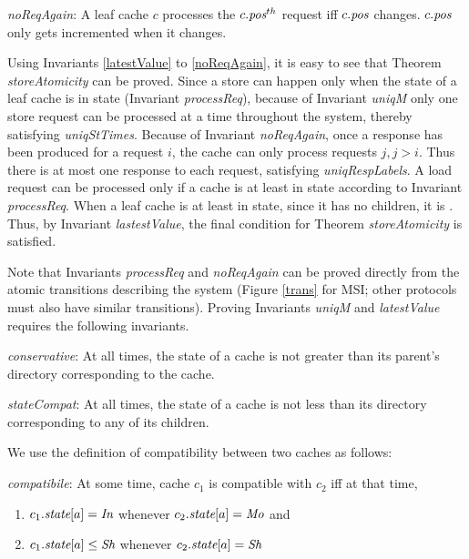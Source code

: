 \begin{inv}
\textit{noReqAgain}: A leaf cache $c$ processes the $c.\textit{pos}^{th}$ request iff
$c.\textit{pos}$ changes. $c.\textit{pos}$ only gets incremented when it changes.
\label{noReqAgain}
\end{inv}

Using Invariants \ref{latestValue} to \ref{noReqAgain}, it is easy to see that
Theorem \textit{storeAtomicity} can be proved. Since a store can happen only
when the state of a leaf cache is in \Mo{} state (Invariant
\textit{processReq}), because of Invariant \textit{uniqM} only one store
request can be processed at a time throughout the system, thereby satisfying
\textit{uniqStTimes}. Because of Invariant \textit{noReqAgain}, once a response
has been produced for a request $i$, the cache can only process requests $j, j
> i$. Thus there is at most one response to each request, satisfying
\textit{uniqRespLabels}. A load request can be processed only if a cache is at
least in \Sh{} state according to Invariant \textit{processReq}.  When a leaf
cache is at least in \Sh{} state, since it has no children, it is \clean{}.
Thus, by Invariant \textit{lastestValue}, the final condition for Theorem
\textit{storeAtomicity} is satisfied.

Note that Invariants \textit{processReq} and \textit{noReqAgain} can be proved
directly from the atomic transitions describing the system (Figure \ref{trans}
for MSI; other protocols must also have similar transitions). Proving Invariants
\textit{uniqM} and \textit{latestValue} requires the following invariants.

\begin{inv}
\textit{conservative}: At all times, the state of a cache is not greater than
its parent's directory corresponding to the cache.
\label{conservative}
\end{inv}

\begin{inv}
\textit{stateCompat}: At all times, the state of a cache is not less than its
directory corresponding to any of its children.
\label{stateCompat}
\end{inv}

We use the definition of compatibility between two caches as follows:
\begin{defn}
\textit{compatibile}: At some time, cache $c_1$ is compatible with $c_2$ iff
at that time,
\begin{enumerate}
\item $c_1.\textit{state}[a] = \textit{In}$ whenever $c_2.\textit{state}[a] = \textit{Mo}$ and
\item $c_1.\textit{state}[a] \le \textit{Sh}$ whenever $c_2.\textit{state}[a] = \textit{Sh}$
\end{enumerate}
\label{compatible}
\end{defn}


